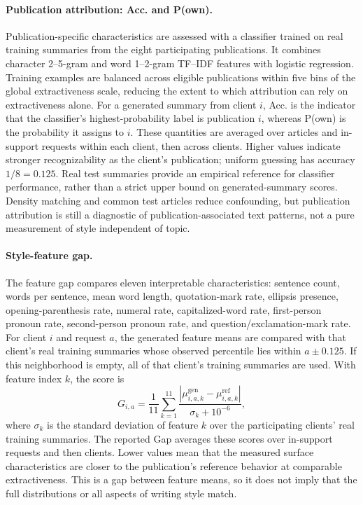 \documentclass[11pt]{article}
\begin{document}
\paragraph{Publication attribution: Acc. and P(own).}
Publication-specific characteristics are assessed with a classifier trained on real training summaries from the eight participating publications. It combines character 2--5-gram and word 1--2-gram TF--IDF features with logistic regression. Training examples are balanced across eligible publications within five bins of the global extractiveness scale, reducing the extent to which attribution can rely on extractiveness alone. For a generated summary from client $i$, Acc. is the indicator that the classifier's highest-probability label is publication $i$, whereas P(own) is the probability it assigns to $i$. These quantities are averaged over articles and in-support requests within each client, then across clients. Higher values indicate stronger recognizability as the client's publication; uniform guessing has accuracy $1/8=0.125$. Real test summaries provide an empirical reference for classifier performance, rather than a strict upper bound on generated-summary scores. Density matching and common test articles reduce confounding, but publication attribution is still a diagnostic of publication-associated text patterns, not a pure measurement of style independent of topic.

\paragraph{Style-feature gap.}
The feature gap compares eleven interpretable characteristics: sentence count, words per sentence, mean word length, quotation-mark rate, ellipsis presence, opening-parenthesis rate, numeral rate, capitalized-word rate, first-person pronoun rate, second-person pronoun rate, and question/exclamation-mark rate. For client $i$ and request $a$, the generated feature means are compared with that client's real training summaries whose observed percentile lies within $a\pm0.125$. If this neighborhood is empty, all of that client's training summaries are used. With feature index $k$, the score is
\begin{equation}
 G_{i,a}=\frac{1}{11}\sum_{k=1}^{11}
 \frac{|\mu^{\mathrm{gen}}_{i,a,k}-\mu^{\mathrm{ref}}_{i,a,k}|}
      {\sigma_k+10^{-6}},
\end{equation}
where $\sigma_k$ is the standard deviation of feature $k$ over the participating clients' real training summaries. The reported Gap averages these scores over in-support requests and then clients. Lower values mean that the measured surface characteristics are closer to the publication's reference behavior at comparable extractiveness. This is a gap between feature means, so it does not imply that the full distributions or all aspects of writing style match.
\end{document}
